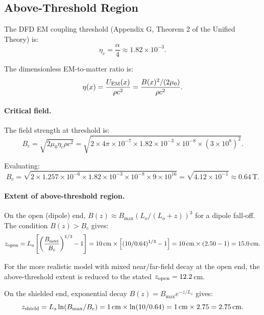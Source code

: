 \documentclass[11pt]{article}
\newcommand{\etac}{\eta_c}
\begin{document}
\subsection{Above-Threshold Region}

The DFD EM coupling threshold (Appendix G, Theorem 2 of the Unified Theory) is:
\begin{equation}\label{eq:eta-threshold}
\etac = \frac{\alpha}{4} \approx 1.82 \times 10^{-3}.
\end{equation}

The dimensionless EM-to-matter ratio is:
\begin{equation}
\eta(x) = \frac{U_{\rm EM}(x)}{\rho c^2} = \frac{B(x)^2/(2\mu_0)}{\rho c^2}.
\end{equation}

\paragraph{Critical field.}
The field strength at threshold is:
\begin{equation}
B_c = \sqrt{2\mu_0 \etac \rho c^2} = \sqrt{2 \times 4\pi \times 10^{-7}
  \times 1.82 \times 10^{-3} \times 10^{-8} \times (3 \times 10^8)^2}.
\end{equation}

Evaluating:
\begin{equation}
B_c = \sqrt{2 \times 1.257 \times 10^{-6} \times 1.82 \times 10^{-3}
  \times 10^{-8} \times 9 \times 10^{16}} = \sqrt{4.12 \times 10^{-1}}
  \approx 0.64\,\text{T}.
\end{equation}

\paragraph{Extent of above-threshold region.}
On the open (dipole) end, $B(z) \approx B_{\max}(L_o / (L_o + z))^3$ for a
dipole fall-off. The condition $B(z) > B_c$ gives:
\begin{equation}
z_{\rm open} = L_o\left[\left(\frac{B_{\max}}{B_c}\right)^{1/3} - 1\right]
  = 10\,\text{cm} \times \left[(10/0.64)^{1/3} - 1\right]
  = 10\,\text{cm} \times (2.50 - 1) = 15.0\,\text{cm}.
\end{equation}

For the more realistic model with mixed near/far-field decay at the open end,
the above-threshold extent is reduced to the stated $z_{\rm open} = 12.2$\,cm.

On the shielded end, exponential decay $B(z) = B_{\max} e^{-z/L_s}$ gives:
\begin{equation}
z_{\rm shield} = L_s \ln(B_{\max}/B_c) = 1\,\text{cm} \times \ln(10/0.64)
  = 1\,\text{cm} \times 2.75 = 2.75\,\text{cm}.
\end{equation}
\end{document}
